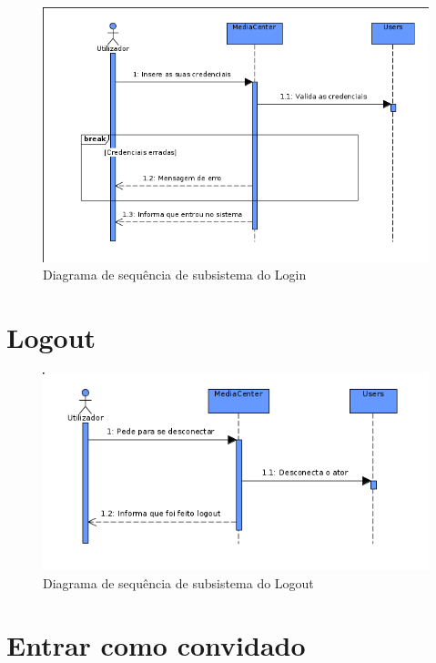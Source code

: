 \documentclass[a4paper]{report}
\begin{document}
\begin{figure}[H]
	\centering 
    \includegraphics[width=\textwidth]{images/loginSub.png}  
    \caption{Diagrama de sequência de subsistema do Login}
\end{figure}

\section{Logout}

\begin{figure}[H]
	\centering 
    \includegraphics[width=\textwidth]{images/logoutSub.png}  
    \caption{Diagrama de sequência de subsistema do Logout}
\end{figure}

\section{Entrar como convidado}
\end{document}
